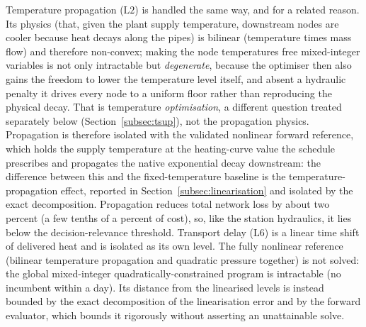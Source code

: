 \documentclass[a4paper,fleqn]{cas-sc}
\newcommand{\Ltwo}{\ensuremath{\mathrm{L2}}}    %
\newcommand{\Lsix}{\ensuremath{\mathrm{L6}}}    %
\begin{document}
Temperature propagation ($\Ltwo$) is handled the same way, and for a related reason. Its physics
(that, given the plant supply temperature, downstream nodes are cooler because heat decays
along the pipes) is bilinear (temperature times mass flow) and therefore non-convex; making the
node temperatures free mixed-integer variables is not only intractable but \emph{degenerate},
because the optimiser then also gains the freedom to lower the temperature level itself, and
absent a hydraulic penalty it drives every node to a uniform floor rather than reproducing the
physical decay. That is temperature \emph{optimisation}, a different question treated separately
below (Section~\ref{subsec:tsup}), not the propagation physics. Propagation is therefore isolated
with the validated nonlinear forward reference, which holds the supply temperature at the
heating-curve value the schedule prescribes and propagates the native exponential decay
downstream: the difference between this and the fixed-temperature baseline is the
temperature-propagation effect, reported in Section~\ref{subsec:linearisation} and isolated by
the exact decomposition. Propagation reduces total network loss by about two percent (a few
tenths of a percent of cost), so, like the station hydraulics, it lies below the
decision-relevance threshold.
Transport delay ($\Lsix$) is a linear time shift of delivered heat and is isolated as its own
level. The fully nonlinear reference (bilinear temperature propagation and quadratic
pressure together) is not solved: the global mixed-integer quadratically-constrained program
is intractable (no incumbent within a day). Its distance from the linearised levels is instead
bounded by the exact decomposition of the linearisation error and by the forward evaluator,
which bounds it rigorously without asserting an unattainable solve.
\end{document}
